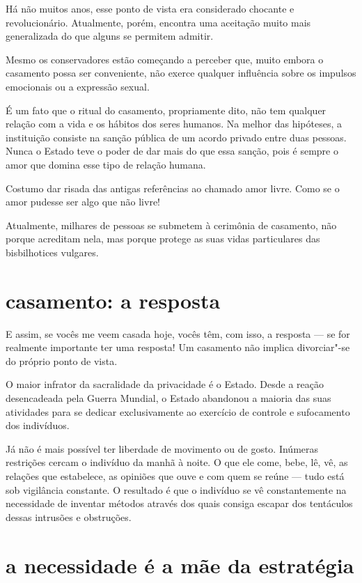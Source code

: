 Há não muitos anos, esse ponto de vista era considerado chocante e
revolucionário. Atualmente, porém, encontra uma aceitação muito mais
generalizada do que alguns se permitem admitir.

Mesmo os conservadores estão começando a perceber que, muito embora o
casamento possa ser conveniente, não exerce qualquer influência sobre os
impulsos emocionais ou a expressão sexual.

É um fato que o ritual do casamento, propriamente dito, não tem qualquer
relação com a vida e os hábitos dos seres humanos. Na melhor das
hipóteses, a instituição consiste na sanção pública de um acordo privado
entre duas pessoas. Nunca o Estado teve o poder de dar mais do que essa
sanção, pois é sempre o amor que domina esse tipo de relação humana.

Costumo dar risada das antigas referências ao chamado amor livre. Como
se o amor pudesse ser algo que não livre!

Atualmente, milhares de pessoas se submetem à cerimônia de casamento,
não porque acreditam nela, mas porque protege as suas vidas particulares
das bisbilhotices vulgares.

\section{casamento: a resposta}

E assim, se vocês me veem casada hoje, vocês têm, com isso, a resposta --- se
for realmente importante ter uma resposta! Um casamento não implica
divorciar"-se do próprio ponto de vista.

O maior infrator da sacralidade da privacidade é o Estado. Desde a\label{ref3}
reação desencadeada pela Guerra Mundial, o Estado abandonou a maioria
das suas atividades para se dedicar exclusivamente ao exercício de
controle e sufocamento dos indivíduos.

Já não é mais possível ter liberdade de movimento ou de gosto. Inúmeras
restrições cercam o indivíduo da manhã à noite. O que ele come, bebe,
lê, vê, as relações que estabelece, as opiniões que ouve e com quem
se reúne --- tudo está sob vigilância constante. O resultado é que o
indivíduo se vê constantemente na necessidade de inventar métodos
através dos quais consiga escapar dos tentáculos dessas intrusões e
obstruções.

\section{a necessidade é a mãe da estratégia}

